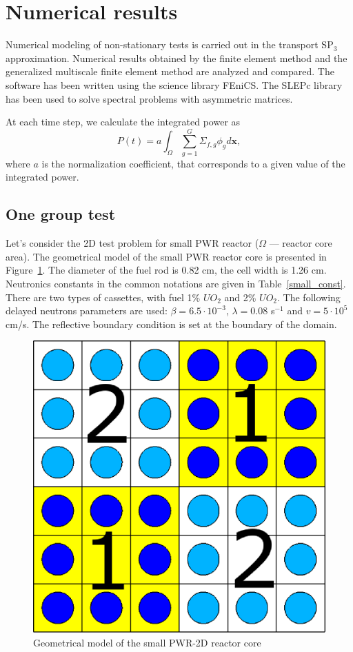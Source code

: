 \documentclass[preprint]{elsarticle}
\begin{document}
\section{Numerical results}
Numerical modeling of non-stationary tests is carried out in the transport SP$_3$ approximation.
Numerical results obtained by the finite element method and the generalized multiscale finite element method are analyzed and compared.
The software has been written using the science library FEniCS.
The SLEPc library has been used to solve spectral problems with asymmetric matrices.

At each time step, we calculate the integrated power as
	\[P(t) = a \int_{\Omega} \sum_{g=1}^{G} \Sigma_{f,g} \phi_g d \bm x,\]
where $a$ is the normalization coefficient, that corresponds to a given value of the integrated power.

\subsection{One group test} %
Let's consider the 2D test problem for small PWR reactor ($\Omega$ --- reactor core area). 
The geometrical model of the small PWR reactor core is presented in Figure~\ref{smallpwr}. 
The diameter of the fuel rod is 0.82 cm, the cell width is 1.26 cm.
Neutronics constants in the common notations are given in Table~\ref{small_const}. 
There are two types of cassettes, with fuel 1\% $UO_2$ and 2\% $UO_2$.
The following delayed neutrons parameters are used: $\beta = 6.5 \cdot 10^{-3}$, $\lambda = 0.08$ s$^{-1}$ and $v = 5 \cdot 10^5$ cm/s.
The reflective boundary condition is set at the boundary of the domain.

\begin{figure}[ht]
	\centering
	    \includegraphics[width=0.45\linewidth] {small/smallpwr_geo.eps}
	\caption{Geometrical model of the small PWR-2D reactor core}
	\label{smallpwr}
\end{figure} 
\end{document}

